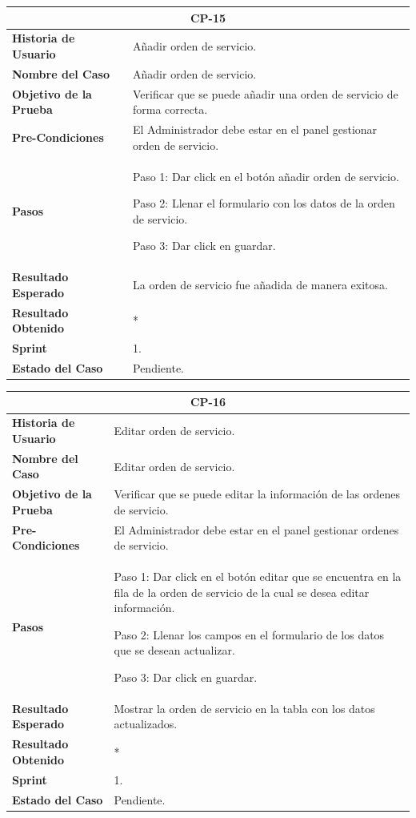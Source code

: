 \documentclass[12pt,a4paper]{article}
\begin{document}
\begin{center}
\begin{tabular}{|m{5cm}|m{9cm}|}
\hline
\multicolumn{2}{|c|}{\textbf{CP-15}} \\
\hline
\textbf{Historia de Usuario} & Añadir orden de servicio. \\
\hline
\textbf{Nombre del Caso} & Añadir orden de servicio. \\
\hline
\textbf{Objetivo de la Prueba} & Verificar que se puede añadir una orden de servicio de forma correcta. \\
\hline
\textbf{Pre-Condiciones} &  El Administrador debe estar en el panel gestionar orden de servicio.\\
\hline
\textbf{Pasos} & Paso 1: Dar click en el botón añadir orden de servicio.

Paso 2: Llenar el formulario con los datos de la orden de servicio.

Paso 3: Dar click en guardar. \\
\hline
\textbf{Resultado Esperado} & La orden de servicio fue añadida de manera exitosa. \\
\hline
\textbf{Resultado Obtenido} & * \\
\hline
\textbf{Sprint} & 1. \\
\hline
\textbf{Estado del Caso} & Pendiente. \\
\hline
\end{tabular}
\vspace{5mm}

\begin{tabular}{|m{5cm}|m{9cm}|}
\hline
\multicolumn{2}{|c|}{\textbf{CP-16}} \\
\hline
\textbf{Historia de Usuario} & Editar orden de servicio. \\
\hline
\textbf{Nombre del Caso} & Editar orden de servicio. \\
\hline
\textbf{Objetivo de la Prueba} & Verificar que se puede editar la información de las ordenes de servicio. \\
\hline
\textbf{Pre-Condiciones} & El Administrador debe estar en el panel gestionar ordenes de servicio. \\
\hline
\textbf{Pasos} & Paso 1: Dar click en el botón editar que se encuentra en la fila de la orden de servicio de la cual se desea editar información.

Paso 2: Llenar los campos en el formulario de los datos que se desean actualizar.

Paso 3: Dar click en guardar.\\
\hline
\textbf{Resultado Esperado} & Mostrar la orden de servicio en la tabla con los datos actualizados. \\
\hline
\textbf{Resultado Obtenido} & * \\
\hline
\textbf{Sprint} & 1. \\
\hline
\textbf{Estado del Caso} & Pendiente. \\
\hline
\end{tabular}
\vspace{5mm}


\end{center}
\end{document}
